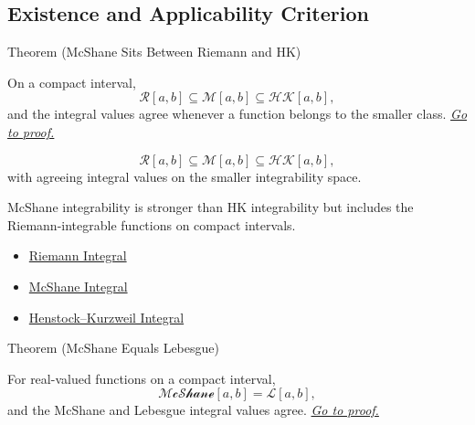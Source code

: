 \subsection*{Existence and Applicability Criterion}

\begin{theorembox}{Theorem (McShane Sits Between Riemann and HK)}
\begin{theorem}
\label{thm:riemann-mcshane-hk-inclusions}
On a compact interval,
\[
  \mathcal R[a,b]\subseteq \mathcal M[a,b]\subseteq \mathcal{HK}[a,b],
\]
and the integral values agree whenever a function belongs to the smaller
class.
\hyperref[prf:riemann-mcshane-hk-inclusions]{\textit{Go to proof.}}
\end{theorem}
\end{theorembox}

\begin{remark*}
\[
\mathcal R[a,b]\subseteq \mathcal M[a,b]\subseteq \mathcal{HK}[a,b],
\]
with agreeing integral values on the smaller integrability space.
\end{remark*}

\begin{remark*}[Interpretation]
McShane integrability is stronger than HK integrability but includes the
Riemann-integrable functions on compact intervals.
\end{remark*}

\begin{dependencies}
\begin{itemize}
  \item \hyperref[def:riemann-integral]{Riemann Integral}
  \item \hyperref[def:mcshane-integral]{McShane Integral}
  \item \hyperref[def:henstock-kurzweil-integral]{Henstock--Kurzweil Integral}
\end{itemize}
\end{dependencies}

\begin{theorembox}{Theorem (McShane Equals Lebesgue)}
\begin{theorem}
\label{thm:mcshane-equals-lebesgue}
For real-valued functions on a compact interval,
\[
  \mathcal{McShane}[a,b]=\mathcal L[a,b],
\]
and the McShane and Lebesgue integral values agree.
\hyperref[prf:mcshane-equals-lebesgue]{\textit{Go to proof.}}
\end{theorem}
\end{theorembox}

